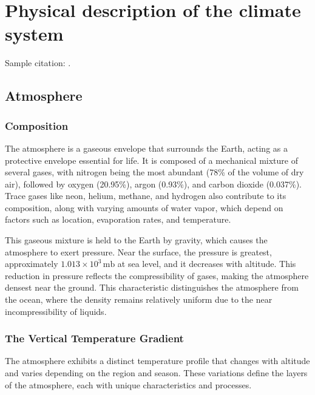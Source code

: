 
\chapter{Physical description of the climate system}

Sample citation: \citet{Richardson1922}.

\section{Atmosphere}
\subsection*{Composition}

The atmosphere is a gaseous envelope that surrounds the Earth, acting as a protective envelope essential for life. It is composed of a mechanical mixture of several gases, with nitrogen being the most abundant (78\% of the volume of dry air), followed by oxygen (20.95\%), argon (0.93\%), and carbon dioxide (0.037\%). Trace gases like neon, helium, methane, and hydrogen also contribute to its composition, along with varying amounts of water vapor, which depend on factors such as location, evaporation rates, and temperature.

This gaseous mixture is held to the Earth by gravity, which causes the atmosphere to exert pressure. Near the surface, the pressure is greatest, approximately $1.013 \times 10^3 \, \mathrm{mb}$ at sea level, and it decreases with altitude. This reduction in pressure reflects the compressibility of gases, making the atmosphere densest near the ground. This characteristic distinguishes the atmosphere from the ocean, where the density remains relatively uniform due to the near incompressibility of liquids.

\subsection*{The Vertical Temperature Gradient}

The atmosphere exhibits a distinct temperature profile that changes with altitude and varies depending on the region and season. These variations define the layers of the atmosphere, each with unique characteristics and processes.

